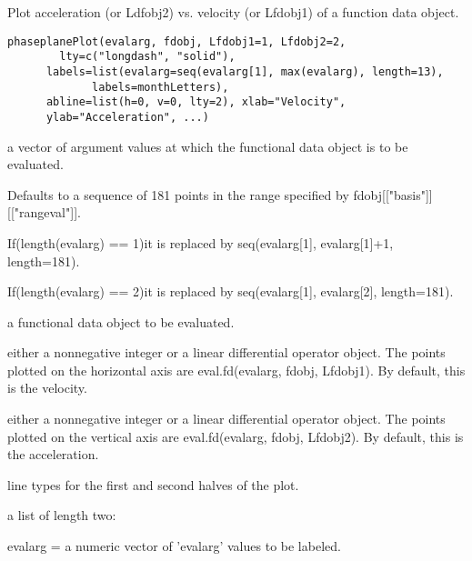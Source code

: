 \documentclass{article}
\begin{document}
\begin{Description}\relax
Plot acceleration (or Ldfobj2) vs. velocity (or Lfdobj1) of a function
data object.
\end{Description}
\begin{Usage}
\begin{verbatim}
phaseplanePlot(evalarg, fdobj, Lfdobj1=1, Lfdobj2=2,
        lty=c("longdash", "solid"),  
      labels=list(evalarg=seq(evalarg[1], max(evalarg), length=13),
             labels=monthLetters),
      abline=list(h=0, v=0, lty=2), xlab="Velocity",
      ylab="Acceleration", ...)
\end{verbatim}
\end{Usage}
\begin{Arguments}
\begin{ldescription}
\item[\code{evalarg}] a vector of argument values at which the functional data object is
to be evaluated.

Defaults to a sequence of 181 points in the range
specified by fdobj[["basis"]][["rangeval"]].      

If(length(evalarg) == 1)it is replaced by seq(evalarg[1],
evalarg[1]+1, length=181).  

If(length(evalarg) == 2)it is replaced by seq(evalarg[1],
evalarg[2], length=181).      

\item[\code{fdobj}] a functional data object to be evaluated.

\item[\code{Lfdobj1}] either a nonnegative integer or a linear differential operator
object.  The points plotted on the horizontal axis are
eval.fd(evalarg, fdobj, Lfdobj1).  By default, this is the
velocity.  

\item[\code{Lfdobj2}] either a nonnegative integer or a linear differential operator
object.  The points plotted on the vertical axis are
eval.fd(evalarg, fdobj, Lfdobj2).  By default, this is the
acceleration.  

\item[\code{lty}] line types for the first and second halves of the plot.  

\item[\code{labels}] a list of length two:

evalarg = a numeric vector of 'evalarg' values to be labeled.


\end{ldescription}
\end{Arguments}
\end{document}
